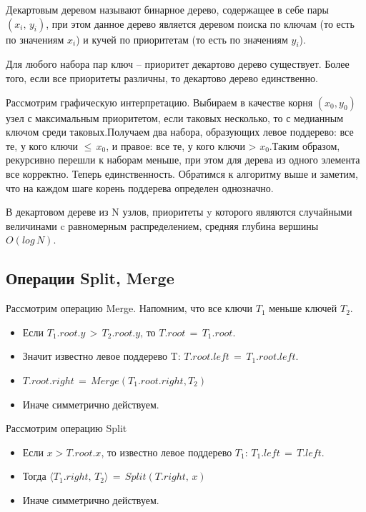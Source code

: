 \Def Декартовым деревом называют бинарное дерево, содержащее в
себе пары $(x_i,\,y_i)$, при этом данное дерево является деревом поиска по
ключам (то есть по значениям $x_i$) и кучей по приоритетам (то есть по
значениям $y_i$).

\Th Для любого набора пар ключ – приоритет декартово
дерево существует. Более того, если все приоритеты различны, то
декартово дерево единственно.

\Proof Рассмотрим графическую интерпретацию. Выбираем в
качестве корня $(x_0, y_0)$ узел с максимальным приоритетом, если
таковых несколько, то с медианным ключом среди таковых.Получаем
два набора, образующих левое поддерево: все те, у кого ключи $\leq\,x_0$, и
правое: все те, у кого ключи > $x_0$.Таким образом, рекурсивно перешли
к наборам меньше, при этом для дерева из одного элемента все
корректно.
Теперь единственность. Обратимся к алгоритму выше и заметим, что
на каждом шаге корень поддерева определен однозначно. \Endproof

\Thbd В декартовом дереве из N узлов, приоритеты y которого являются случайными величинами c равномерным распределением, средняя глубина вершины $O(log\,N)$.

\subsection*{Операции Split, Merge}

Рассмотрим операцию Merge. Напомним, что все ключи $T_1$ меньше
ключей $T_2$.

\begin{itemize}
    \item Если $T_1.root.y\,>\,T_2.root.y\text{, то }T.root\,=\,T_1.root$.
    \item Значит известно левое поддерево T: $T.root.left\,=\,T_1.root.left$.
    \item $T.root.right\,=\,Merge(T_1.root.right, T_2)$
    \item Иначе симметрично действуем.
\end{itemize}

\pagebreak
Рассмотрим операцию Split

\begin{itemize}
    \item Если $x > T.root.x$, то известно левое поддерево $T_1$: $T_1.left\,=\,T.left$.
    \item Тогда $\langle T_1.right,\,T_2\rangle\,=\,Split(T.right,\,x)$  
    \item Иначе симметрично действуем.
\end{itemize}

